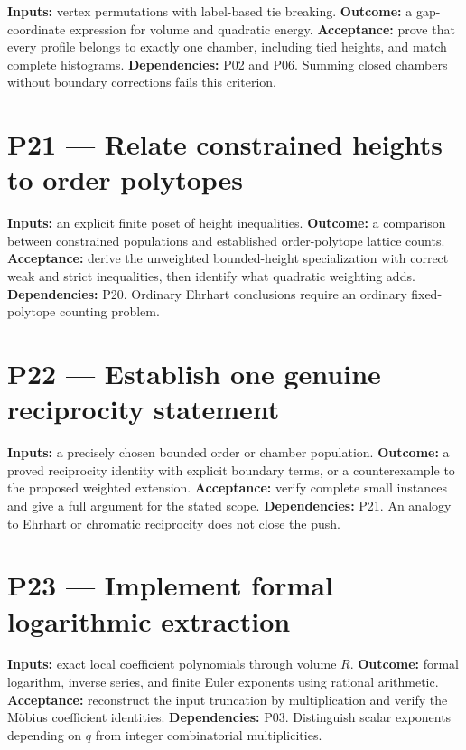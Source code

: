 \documentclass[
  11pt,
  a4paper,
]{report}
\begin{document}
\textbf{Inputs:} vertex permutations with label-based tie breaking.
\textbf{Outcome:} a gap-coordinate expression for volume and quadratic
energy. \textbf{Acceptance:} prove that every profile belongs to exactly
one chamber, including tied heights, and match complete histograms.
\textbf{Dependencies:} P02 and P06. Summing closed chambers without
boundary corrections fails this criterion.

\hypertarget{p21-relate-constrained-heights-to-order-polytopes}{%
\section{P21 --- Relate constrained heights to order
polytopes}\label{p21-relate-constrained-heights-to-order-polytopes}}

\textbf{Inputs:} an explicit finite poset of height inequalities.
\textbf{Outcome:} a comparison between constrained populations and
established order-polytope lattice counts. \textbf{Acceptance:} derive
the unweighted bounded-height specialization with correct weak and
strict inequalities, then identify what quadratic weighting adds.
\textbf{Dependencies:} P20. Ordinary Ehrhart conclusions require an
ordinary fixed-polytope counting problem.

\hypertarget{p22-establish-one-genuine-reciprocity-statement}{%
\section{P22 --- Establish one genuine reciprocity
statement}\label{p22-establish-one-genuine-reciprocity-statement}}

\textbf{Inputs:} a precisely chosen bounded order or chamber population.
\textbf{Outcome:} a proved reciprocity identity with explicit boundary
terms, or a counterexample to the proposed weighted extension.
\textbf{Acceptance:} verify complete small instances and give a full
argument for the stated scope. \textbf{Dependencies:} P21. An analogy to
Ehrhart or chromatic reciprocity does not close the push.

\hypertarget{p23-implement-formal-logarithmic-extraction}{%
\section{P23 --- Implement formal logarithmic
extraction}\label{p23-implement-formal-logarithmic-extraction}}

\textbf{Inputs:} exact local coefficient polynomials through volume
\(R\). \textbf{Outcome:} formal logarithm, inverse series, and finite
Euler exponents using rational arithmetic. \textbf{Acceptance:}
reconstruct the input truncation by multiplication and verify the Möbius
coefficient identities. \textbf{Dependencies:} P03. Distinguish scalar
exponents depending on \(q\) from integer combinatorial multiplicities.
\end{document}
